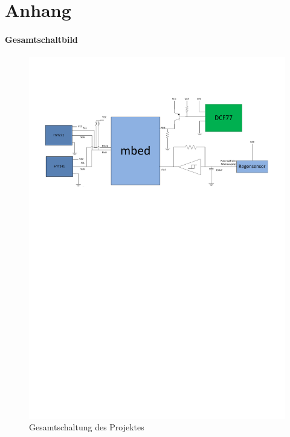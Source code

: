 \chapter{Anhang}
\subsubsection{Gesamtschaltbild}
\begin{figure}[H]
\centering
\includegraphics[width=\textwidth]{./Schaltplaene/Gesamt-Schaltung}
\caption{Gesamtschaltung des Projektes}
\label{fig:Gesamt-Schaltung}
\end{figure}
